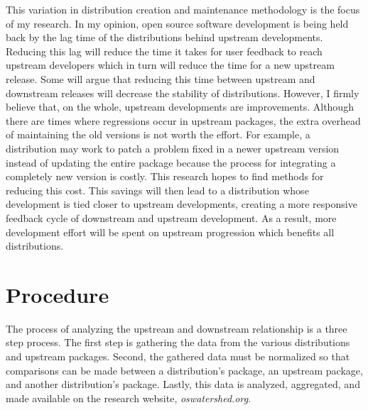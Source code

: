 \documentclass[letterpaper,10pt]{article}
\begin{document}
This variation in distribution creation and maintenance methodology is the focus of my research.  In my opinion, open source software development is being held back by the lag time of the distributions behind upstream developments.  Reducing this lag will reduce the time it takes for user feedback to reach upstream developers which in turn will reduce the time for a new upstream release.  Some will argue that reducing this time between upstream and downstream releases will decrease the stability of distributions.  However, I firmly believe that, on the whole, upstream developments are improvements.  Although there are times where regressions occur in upstream packages, the extra overhead of maintaining the old versions is not worth the effort.  For example, a distribution may work to patch a problem fixed in a newer upstream version instead of updating the entire package because the process for integrating a completely new version is costly. This research hopes to find methods for reducing this cost.  This savings will then lead to a distribution whose development is tied closer to upstream developments, creating a more responsive feedback cycle of downstream and upstream development.  As a result, more development effort will be spent on upstream progression which benefits all distributions.

\section{Procedure}
The process of analyzing the upstream and downstream relationship is a three step process.  The first step is gathering the data from the various distributions and upstream packages.  Second, the gathered data must be normalized so that comparisons can be made between a distribution's package, an upstream package, and another distribution's package.  Lastly, this data is analyzed, aggregated, and made available on the research website, \emph{oswatershed.org}.
\end{document}
